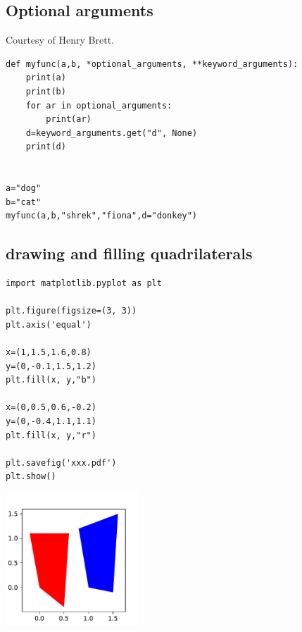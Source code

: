 \subsection{Optional arguments}

Courtesy of Henry Brett.

\begin{lstlisting}
def myfunc(a,b, *optional_arguments, **keyword_arguments):
    print(a)
    print(b)
    for ar in optional_arguments:
        print(ar)
    d=keyword_arguments.get("d", None)
    print(d)
    

a="dog"
b="cat"
myfunc(a,b,"shrek","fiona",d="donkey")
\end{lstlisting}

\subsection{drawing and filling quadrilaterals}

\begin{lstlisting}
import matplotlib.pyplot as plt

plt.figure(figsize=(3, 3))
plt.axis('equal')

x=(1,1.5,1.6,0.8)
y=(0,-0.1,1.5,1.2)
plt.fill(x, y,"b")

x=(0,0.5,0.6,-0.2)
y=(0,-0.4,1.1,1.1)
plt.fill(x, y,"r")

plt.savefig('xxx.pdf')
plt.show()

\end{lstlisting}

\begin{center}
\includegraphics[width=5cm]{images/python/xxx}
\end{center}






